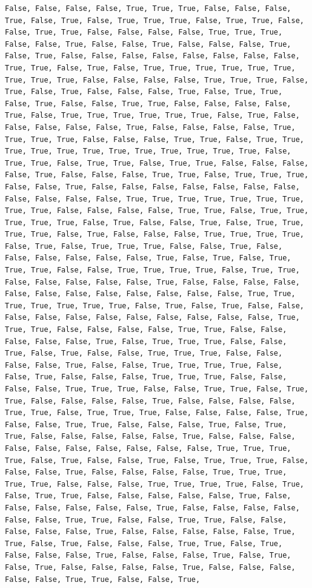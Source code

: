 \documentclass[
  letterpaper,
  DIV=11,
  numbers=noendperiod]{scrartcl}
\begin{document}
\begin{verbatim}
False, False, False, False, True, True, True, False, False, False, True, False, True, False, True, True, True, False, True, True, False, False, True, True, False, False, False, False, True, True, True, False, False, True, False, False, True, False, False, False, True, False, True, False, False, False, False, False, False, False, False, True, True, False, True, False, True, True, True, True, True, True, True, True, True, False, False, False, False, True, True, True, False, True, False, True, False, False, False, True, False, True, True, False, True, False, False, True, True, False, False, False, False, True, False, True, True, True, True, True, True, False, True, False, False, False, False, False, True, False, False, False, False, True, True, True, True, False, False, False, True, True, False, True, True, True, True, True, True, True, True, True, True, True, True, False, True, True, False, True, True, False, True, True, False, False, False, False, True, False, False, False, True, True, False, True, True, True, False, False, True, False, False, False, False, False, False, False, False, False, False, False, True, True, True, True, True, True, True, True, True, False, False, False, False, True, True, False, True, True, True, True, True, False, True, False, False, True, False, True, True, True, True, False, True, False, False, False, True, True, True, True, False, True, False, True, True, True, False, False, True, False, False, False, False, False, False, True, False, True, False, True, True, True, False, False, True, True, True, True, False, True, True, False, False, False, False, False, True, False, False, False, False, False, False, False, False, False, False, False, False, True, True, True, True, True, True, True, False, True, False, True, False, False, False, False, False, False, False, False, False, False, False, True, True, True, False, False, False, False, True, True, False, False, False, False, False, True, False, True, True, True, False, False, True, False, True, False, False, True, True, True, False, False, False, False, True, False, False, True, True, True, True, False, False, True, False, False, False, True, True, True, False, False, False, False, True, True, True, False, False, True, True, False, True, True, False, False, False, False, True, False, False, False, False, True, True, False, True, True, True, False, False, False, False, True, False, False, True, True, False, False, False, True, False, True, True, False, False, False, False, False, True, False, False, False, False, False, False, False, False, False, False, True, True, True, True, False, True, False, False, True, False, True, True, True, False, False, False, True, False, False, False, False, True, True, True, True, True, False, False, False, True, True, True, True, False, True, False, True, True, False, False, False, False, False, True, False, False, False, False, False, False, True, False, False, False, False, False, False, True, True, False, False, True, True, False, False, False, False, False, True, False, False, False, False, False, True, True, False, True, False, False, False, True, True, False, True, False, False, False, True, False, False, False, True, False, True, False, True, False, False, False, False, True, False, False, False, False, False, True, True, False, False, True, 
\end{verbatim}
\end{document}
